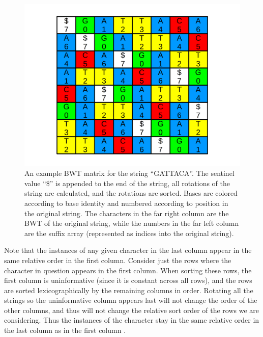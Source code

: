 \documentclass[11pt,proposal]{ucthesis}
\begin{document}
\begin{figure}[ht]
    \centering
    \includegraphics[width=1.0\textwidth]{figures/bwt.png}
    \caption[An example BWT matrix for the string ``GATTACA'']{An example BWT matrix for the string ``GATTACA''. The sentinel value ``\$'' is appended to the end of the string, all rotations of the string are calculated, and the rotations are sorted. Bases are colored according to base identity and numbered according to position in the original string. The characters in the far right column are the BWT of the original string, while the numbers in the far left column are the suffix array (represented as indices into the original string).}
    \label{fig:bwt}
\end{figure}

Note that the instances of any given character in the last column appear in the same relative order in the first column. Consider just the rows where the character in question appears in the first column. When sorting these rows, the first column is uninformative (since it is constant across all rows), and the rows are sorted lexicographically by the remaining columns in order. Rotating all the strings so the uninformative column appears last will not change the order of the other columns, and thus will not change the relative sort order of the rows we are considering. Thus the instances of the character stay in the same relative order in the last column as in the first column \cite{langmead2013introduction}.


    
\end{document}
